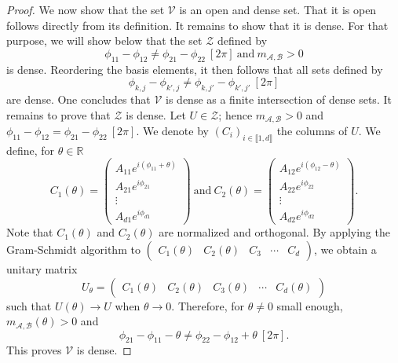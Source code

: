 \documentclass[a4paper, notitlepage, 11pt]{article}
\numberwithin{equation}{section}
\newcommand{\mcl}[1]{\mathcal{#1}}
\newcommand{\Acal}{{\mathcal A}}
\newcommand{\Bcal}{{\mathcal B}}
\newcommand{\R}{\mathbb{R}}
\newcommand{\mab}{m_{\Acal,\Bcal}}
\newcommand{\IntEnt}[2]{\llbracket #1 , #2 \rrbracket}
\begin{document}
\begin{proof}
We now show that the set $\mcl{V}$ is an open and dense set. That it is open follows directly from its definition. It remains to show that it is dense. For that purpose, we will show below that the set $\mcl{Z}$ defined by 
\[
\phi_{11} - \phi_{12} \neq \phi_{21} - \phi_{22} ~[2\pi]
\ \mathrm{and} \ \mab > 0
\]
is dense. Reordering the basis elements, it then follows that all sets defined by 
$$
\phi_{k,j} -  \phi_{k',j} \neq  \phi_{k,j'} -  \phi_{k',j'} ~[2\pi]
$$
are dense. One concludes that $\mathcal V$ is dense as a finite intersection of dense sets. 
It remains to prove that $\mathcal Z$ is dense. Let $U\in\mcl{Z}$; hence $\mab > 0$ and $\phi_{11} - \phi_{12} = \phi_{21} - \phi_{22} ~[2\pi]$. We denote by $(C_i)_{i\in\IntEnt{1}{d}}$ the columns of $U$. We define, for $\theta\in \R$
\begin{equation}\label{eq:pure_char_1}
C_{1}(\theta) = \begin{pmatrix}
A_{11}e^{i(\phi_{11}+\theta)} \\
A_{21}e^{i\phi_{21}}\\
\vdots\\
A_{d1}e^{i\phi_{d1}}
\end{pmatrix} \ \mathrm{ and } \ C_{2}(\theta) = \begin{pmatrix}
A_{12}e^{i(\phi_{12}-\theta)} \\
A_{22}e^{i\phi_{22}}\\
\vdots\\
A_{d2}e^{i\phi_{d2}}
\end{pmatrix}.
\end{equation}
Note that $C_1(\theta)$ and $C_2(\theta)$ are normalized and orthogonal. By applying the Gram-Schmidt algorithm to $\begin{pmatrix}
    C_{1}(\theta) & C_{2}(\theta) & C_{3} & \cdots & C_{d}
\end{pmatrix}$, we obtain a unitary matrix 
$$
U_{\theta}=\begin{pmatrix}
    C_{1}(\theta) & C_{2}(\theta) & C_{3}(\theta) & \cdots & C_{d}(\theta)
\end{pmatrix}
$$
such that $U(\theta) \rightarrow U$ when $\theta \rightarrow 0$. %
Therefore, for $\theta\not=0$ small enough, $\mab(\theta) > 0$ and 
\[
\phi_{21} - \phi_{11} - \theta \neq \phi_{22} - \phi_{12}+\theta \ [2\pi].
\]
This proves $\mcl{V}$ is dense. 


\end{proof}
\end{document}
